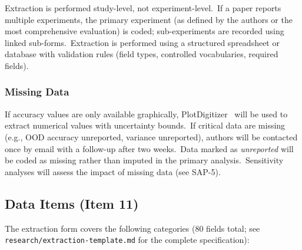Extraction is performed study-level, not experiment-level.\ If a paper reports multiple experiments, the primary experiment (as defined by the authors or the most comprehensive evaluation) is coded; sub-experiments are recorded using linked sub-forms.\ Extraction is performed using a structured spreadsheet or database with validation rules (field types, controlled vocabularies, required fields).

\subsubsection{Missing Data}

If accuracy values are only available graphically, PlotDigitizer~\cite{plotdigitizer} will be used to extract numerical values with uncertainty bounds.\ If critical data are missing (e.g., OOD accuracy unreported, variance unreported), authors will be contacted once by email with a follow-up after two weeks.\ Data marked as \textit{unreported} will be coded as missing rather than imputed in the primary analysis.\ Sensitivity analyses will assess the impact of missing data (see SAP-5).

\subsection{Data Items (Item 11)}

The extraction form covers the following categories (80 fields total; see \texttt{research/extraction-template.md} for the complete specification):

